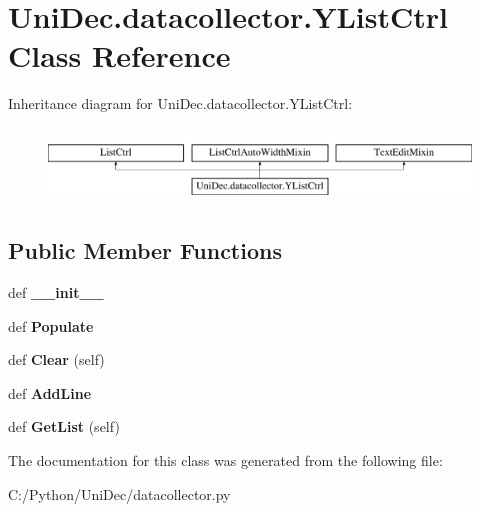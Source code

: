 \hypertarget{class_uni_dec_1_1datacollector_1_1_y_list_ctrl}{}\section{Uni\+Dec.\+datacollector.\+Y\+List\+Ctrl Class Reference}
\label{class_uni_dec_1_1datacollector_1_1_y_list_ctrl}
Inheritance diagram for Uni\+Dec.\+datacollector.\+Y\+List\+Ctrl\+:\begin{figure}[H]
\begin{center}
\leavevmode
\includegraphics[height=1.964912cm]{class_uni_dec_1_1datacollector_1_1_y_list_ctrl}
\end{center}
\end{figure}
\subsection*{Public Member Functions}
\begin{DoxyCompactItemize}
\item 
\hypertarget{class_uni_dec_1_1datacollector_1_1_y_list_ctrl_a2ed34840b7477a2c96cd4e0021e1f35c}{}def {\bfseries \+\_\+\+\_\+init\+\_\+\+\_\+}\label{class_uni_dec_1_1datacollector_1_1_y_list_ctrl_a2ed34840b7477a2c96cd4e0021e1f35c}

\item 
\hypertarget{class_uni_dec_1_1datacollector_1_1_y_list_ctrl_a7350a929dfe8d90653f01a9a5256c0ec}{}def {\bfseries Populate}\label{class_uni_dec_1_1datacollector_1_1_y_list_ctrl_a7350a929dfe8d90653f01a9a5256c0ec}

\item 
\hypertarget{class_uni_dec_1_1datacollector_1_1_y_list_ctrl_a45fc5117e52b82f6c1bea5d869b720d4}{}def {\bfseries Clear} (self)\label{class_uni_dec_1_1datacollector_1_1_y_list_ctrl_a45fc5117e52b82f6c1bea5d869b720d4}

\item 
\hypertarget{class_uni_dec_1_1datacollector_1_1_y_list_ctrl_a9113ab87f035748480f8d3d88e439bf4}{}def {\bfseries Add\+Line}\label{class_uni_dec_1_1datacollector_1_1_y_list_ctrl_a9113ab87f035748480f8d3d88e439bf4}

\item 
\hypertarget{class_uni_dec_1_1datacollector_1_1_y_list_ctrl_abc3344b84bbae88213f2a2bfa57e0a23}{}def {\bfseries Get\+List} (self)\label{class_uni_dec_1_1datacollector_1_1_y_list_ctrl_abc3344b84bbae88213f2a2bfa57e0a23}

\end{DoxyCompactItemize}


The documentation for this class was generated from the following file\+:\begin{DoxyCompactItemize}
\item 
C\+:/\+Python/\+Uni\+Dec/datacollector.\+py\end{DoxyCompactItemize}
